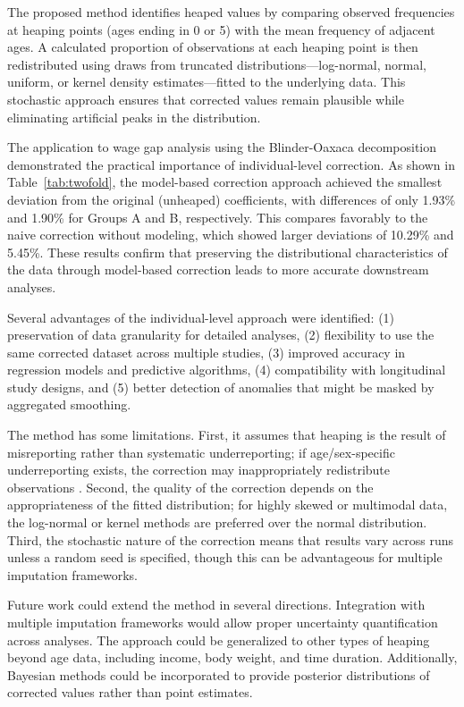 \documentclass[12pt]{article}
\theoremstyle{plain}
\theoremstyle{definition}
\begin{document}
The proposed method identifies heaped values by comparing observed frequencies at heaping points (ages ending in 0 or 5) with the mean frequency of adjacent ages. A calculated proportion of observations at each heaping point is then redistributed using draws from truncated distributions---log-normal, normal, uniform, or kernel density estimates---fitted to the underlying data. This stochastic approach ensures that corrected values remain plausible while eliminating artificial peaks in the distribution.

The application to wage gap analysis using the Blinder-Oaxaca decomposition demonstrated the practical importance of individual-level correction. As shown in Table~\ref{tab:twofold}, the model-based correction approach achieved the smallest deviation from the original (unheaped) coefficients, with differences of only 1.93\% and 1.90\% for Groups A and B, respectively. This compares favorably to the naive correction without modeling, which showed larger deviations of 10.29\% and 5.45\%. These results confirm that preserving the distributional characteristics of the data through model-based correction leads to more accurate downstream analyses.

Several advantages of the individual-level approach were identified: (1) preservation of data granularity for detailed analyses, (2) flexibility to use the same corrected dataset across multiple studies, (3) improved accuracy in regression models and predictive algorithms, (4) compatibility with longitudinal study designs, and (5) better detection of anomalies that might be masked by aggregated smoothing.

The method has some limitations. First, it assumes that heaping is the result of misreporting rather than systematic underreporting; if age/sex-specific underreporting exists, the correction may inappropriately redistribute observations \citep{preston1999}. Second, the quality of the correction depends on the appropriateness of the fitted distribution; for highly skewed or multimodal data, the log-normal or kernel methods are preferred over the normal distribution. Third, the stochastic nature of the correction means that results vary across runs unless a random seed is specified, though this can be advantageous for multiple imputation frameworks.

Future work could extend the method in several directions. Integration with multiple imputation frameworks would allow proper uncertainty quantification across analyses. The approach could be generalized to other types of heaping beyond age data, including income, body weight, and time duration. Additionally, Bayesian methods could be incorporated to provide posterior distributions of corrected values rather than point estimates.
\end{document}
